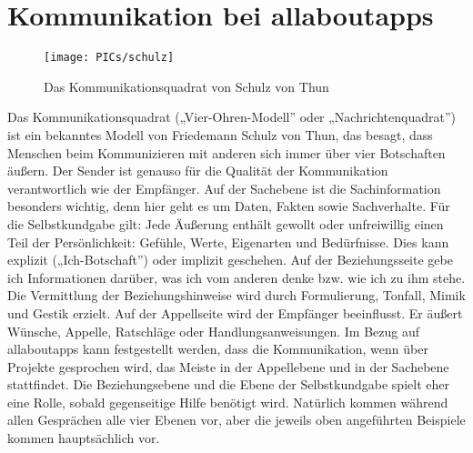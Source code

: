 \section{Kommunikation bei allaboutapps}


\begin{figure}[!htbp]
\centering
\texttt{[image: PICs/schulz]}
\caption{Das Kommunikationsquadrat von Schulz von Thun}\label{Abb1}
\end{figure}

Das Kommunikationsquadrat („Vier-Ohren-Modell” oder „Nachrichtenquadrat”) ist ein bekanntes Modell von Friedemann Schulz von Thun, das besagt, dass Menschen beim Kommunizieren mit anderen sich immer über vier Botschaften äußern. Der Sender ist genauso für die Qualität der Kommunikation verantwortlich wie der Empfänger. \cite{schulzThun} \newline
Auf der Sachebene ist die Sachinformation besonders wichtig, denn hier geht es um Daten, Fakten sowie Sachverhalte. Für die Selbstkundgabe gilt: Jede Äußerung enthält gewollt oder unfreiwillig einen Teil der Persönlichkeit: Gefühle, Werte, Eigenarten und Bedürfnisse. Dies kann explizit („Ich-Botschaft”) oder implizit geschehen. Auf der Beziehungsseite gebe ich Informationen darüber, was ich vom anderen denke bzw. wie ich zu ihm stehe. Die Vermittlung der Beziehungshinweise wird durch Formulierung, Tonfall, Mimik und Gestik erzielt. Auf der Appellseite wird der Empfänger beeinflusst. Er äußert Wünsche, Appelle, Ratschläge oder Handlungsanweisungen. \cite{schulzThun} \newline
Im Bezug auf allaboutapps kann festgestellt werden, dass die Kommunikation, wenn über Projekte gesprochen wird, das Meiste in der Appellebene und in der Sachebene stattfindet. Die Beziehungsebene und die Ebene der Selbstkundgabe spielt eher eine Rolle, sobald gegenseitige Hilfe benötigt wird. Natürlich kommen während allen Gesprächen alle vier Ebenen vor, aber die jeweils oben angeführten Beispiele kommen hauptsächlich vor.





















